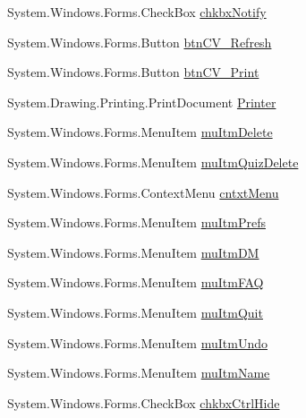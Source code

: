 \begin{DoxyCompactItemize}
\-System.\-Windows.\-Forms.\-Check\-Box \hyperlink{class_sr_p___classroom_inq_1_1frm_classrrom_inq_a86f98a8c743985a65d129f24ed240ba6}{chkbx\-Notify}
\item 
\-System.\-Windows.\-Forms.\-Button \hyperlink{class_sr_p___classroom_inq_1_1frm_classrrom_inq_acab3b8f1dd8b8c6298dd2c11aa764a29}{btn\-C\-V\-\_\-\-Refresh}
\item 
\-System.\-Windows.\-Forms.\-Button \hyperlink{class_sr_p___classroom_inq_1_1frm_classrrom_inq_aa974c0ec46e2bca7bea74774e0f460d4}{btn\-C\-V\-\_\-\-Print}
\item 
\-System.\-Drawing.\-Printing.\-Print\-Document \hyperlink{class_sr_p___classroom_inq_1_1frm_classrrom_inq_a27d138482c23d40f494f49984816227e}{\-Printer}
\item 
\-System.\-Windows.\-Forms.\-Menu\-Item \hyperlink{class_sr_p___classroom_inq_1_1frm_classrrom_inq_afb6bae444aa0f2084f3d447454a29e47}{mu\-Itm\-Delete}
\item 
\-System.\-Windows.\-Forms.\-Menu\-Item \hyperlink{class_sr_p___classroom_inq_1_1frm_classrrom_inq_a2d03550cfd9c6e91732a9a669089cb48}{mu\-Itm\-Quiz\-Delete}
\item 
\-System.\-Windows.\-Forms.\-Context\-Menu \hyperlink{class_sr_p___classroom_inq_1_1frm_classrrom_inq_a7fb167457515aba637054c47a301188e}{cntxt\-Menu}
\item 
\-System.\-Windows.\-Forms.\-Menu\-Item \hyperlink{class_sr_p___classroom_inq_1_1frm_classrrom_inq_a13631d0933d2eb8825ef015322073644}{mu\-Itm\-Prefs}
\item 
\-System.\-Windows.\-Forms.\-Menu\-Item \hyperlink{class_sr_p___classroom_inq_1_1frm_classrrom_inq_a1ab66b5e5506390fd7dab2fae510c610}{mu\-Itm\-D\-M}
\item 
\-System.\-Windows.\-Forms.\-Menu\-Item \hyperlink{class_sr_p___classroom_inq_1_1frm_classrrom_inq_aecb074ee2d728e4e88009f9a6f3c4f6d}{mu\-Itm\-F\-A\-Q}
\item 
\-System.\-Windows.\-Forms.\-Menu\-Item \hyperlink{class_sr_p___classroom_inq_1_1frm_classrrom_inq_a139fd89a3fbbc5272712ac921557dd03}{mu\-Itm\-Quit}
\item 
\-System.\-Windows.\-Forms.\-Menu\-Item \hyperlink{class_sr_p___classroom_inq_1_1frm_classrrom_inq_aa3e4ca1c9b69ec8008d53de0a7727b9f}{mu\-Itm\-Undo}
\item 
\-System.\-Windows.\-Forms.\-Menu\-Item \hyperlink{class_sr_p___classroom_inq_1_1frm_classrrom_inq_a62421b36b63800d99afde1f0494d3e5f}{mu\-Itm\-Name}
\item 
\-System.\-Windows.\-Forms.\-Check\-Box \hyperlink{class_sr_p___classroom_inq_1_1frm_classrrom_inq_a65b5726e5b2299abee70eba1a67b6ea3}{chkbx\-Ctrl\-Hide}

\end{DoxyCompactItemize}

